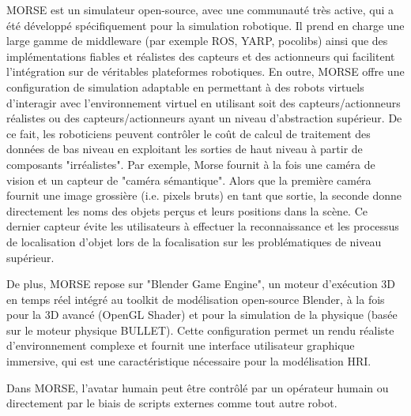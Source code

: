 \documentclass[a4paper,11pt,twoside]{StyleThese}
\begin{document}
MORSE est un simulateur open-source, avec une communauté très active, qui a été développé spécifiquement pour la simulation robotique. Il prend en charge une large gamme de middleware (par exemple ROS, YARP, pocolibs) ainsi que des implémentations fiables et réalistes des capteurs et des actionneurs qui facilitent l'intégration sur de véritables plateformes robotiques.
En outre, MORSE offre une configuration de simulation adaptable en permettant à des robots virtuels d'interagir avec l'environnement virtuel en utilisant soit des capteurs/actionneurs réalistes ou des capteurs/actionneurs ayant un niveau d'abstraction supérieur. De ce fait, les roboticiens peuvent contrôler le coût de calcul de traitement des données de bas niveau en exploitant les sorties de haut niveau à partir de composants "irréalistes".
%
Par exemple, Morse fournit à la fois une caméra de vision et
un capteur de "caméra sémantique". Alors que la première caméra fournit une image grossière (i.e. pixels bruts) en tant que sortie, la seconde
donne directement les noms des objets perçus et leurs positions dans la scène.
Ce dernier capteur évite les utilisateurs à effectuer la reconnaissance et les processus de localisation d'objet lors de la focalisation sur les problématiques de niveau supérieur.

De plus, MORSE repose sur "Blender Game Engine",
un moteur d'exécution 3D en temps réel intégré au toolkit de modélisation open-source Blender, à la fois pour la 3D avancé (OpenGL Shader) et
pour la simulation de la physique (basée sur le moteur physique BULLET).
Cette configuration permet un rendu réaliste d'environnement complexe et fournit une interface utilisateur graphique immersive, qui est une caractéristique nécessaire %
pour la modélisation HRI.

Dans MORSE, l'avatar humain peut être contrôlé par un opérateur humain ou directement par le biais de scripts externes comme tout autre robot.


\end{document}
